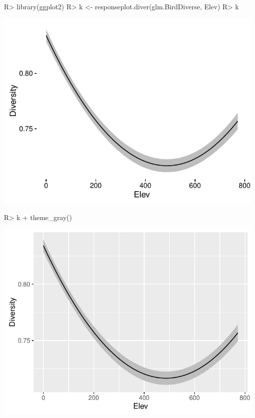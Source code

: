 \documentclass[article]{jss}
\begin{document}
\begin{CodeChunk}

\begin{CodeInput}
R> library(ggplot2)
R> k <- responseplot.diver(glm.BirdDiverse, Elev)
R> k
\end{CodeInput}


\begin{center}\includegraphics{diversityocc_files/figure-latex/unnamed-chunk-21-1} \end{center}


\begin{CodeInput}
R> k + theme_gray()
\end{CodeInput}


\begin{center}\includegraphics{diversityocc_files/figure-latex/unnamed-chunk-21-2} \end{center}



\end{CodeChunk}
\end{document}

